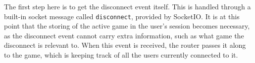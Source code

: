 The first step here is to get the disconnect event itself. This is handled through a built-in socket message called \texttt{disconnect}, provided by SocketIO. It is at this point that the storing of the active game in the user's session becomes necessary, as the disconnect event cannot carry extra information, such as what game the disconnect is relevant to. When this event is received, the router passes it along to the game, which is keeping track of all the users currently connected to it.




